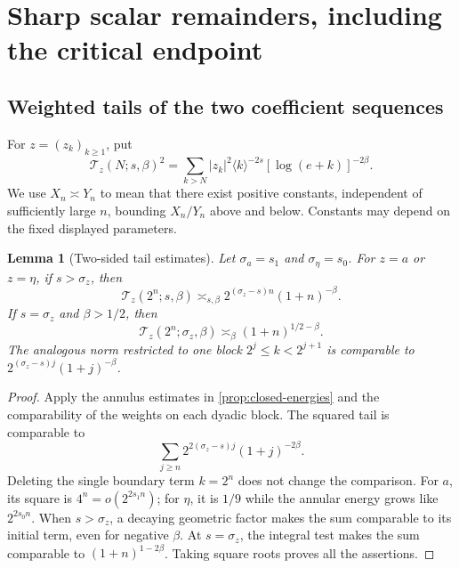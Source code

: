 \documentclass[11pt,a4paper]{article}
\newtheorem{lemma}[theorem]{Lemma}
\theoremstyle{definition}
\theoremstyle{remark}
\newcommand{\br}[1]{\langle#1\rangle}
\numberwithin{equation}{section}
\begin{document}
\section{Sharp scalar remainders, including the critical endpoint}
\label{sec:sharp-remainders}

\subsection{Weighted tails of the two coefficient sequences}
For $z=(z_k)_{k\ge1}$, put
\begin{equation}
 \mathcal T_z(N;s,\beta)^2=
 \sum_{k>N}|z_k|^2\br{k}^{-2s}[\log(e+k)]^{-2\beta}.
 \label{eq:weighted-tail}
\end{equation}
We use $X_n\asymp Y_n$ to mean that there exist positive constants,
independent of sufficiently large $n$, bounding $X_n/Y_n$ above and below.
Constants may depend on the fixed displayed parameters.

\begin{lemma}[Two-sided tail estimates]
\label{lem:tails}
Let $\sigma_a=s_1$ and $\sigma_\eta=s_0$. For $z=a$ or $z=\eta$,
if $s>\sigma_z$, then
\begin{equation}
 \mathcal T_z(2^n;s,\beta)
 \asymp_{s,\beta}2^{(\sigma_z-s)n}(1+n)^{-\beta}.
 \label{eq:tail-supercritical}
\end{equation}
If $s=\sigma_z$ and $\beta>1/2$, then
\begin{equation}
 \mathcal T_z(2^n;\sigma_z,\beta)
 \asymp_\beta(1+n)^{1/2-\beta}.
 \label{eq:tail-critical}
\end{equation}
The analogous norm restricted to one block $2^j\le k<2^{j+1}$ is
comparable to $2^{(\sigma_z-s)j}(1+j)^{-\beta}$.
\end{lemma}
\begin{proof}
Apply the annulus estimates in \cref{prop:closed-energies} and the
comparability of the weights on each dyadic block. The squared tail is
comparable to
\[
 \sum_{j\ge n}2^{2(\sigma_z-s)j}(1+j)^{-2\beta}.
\]
Deleting the single boundary term $k=2^n$ does not change the comparison.
For $a$, its square is $4^n=o(2^{2s_1n})$; for $\eta$, it is $1/9$
while the annular energy grows like $2^{2s_0n}$. When $s>\sigma_z$,
a decaying geometric factor makes the sum comparable to its initial
term, even for negative $\beta$. At $s=\sigma_z$, the integral test
makes the sum comparable to $(1+n)^{1-2\beta}$. Taking square roots
proves all the assertions.
\end{proof}
\end{document}
